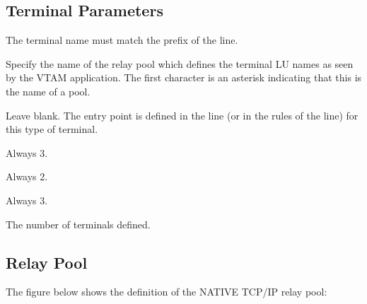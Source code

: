 \documentclass[letterpaper,10pt,english]{sphinxmanual}
\begin{document}
\sphinxAtStartPar
{}

\ignorespaces 

\subsection{Terminal Parameters}
\label{\detokenize{connectivity_guide:index-37}}\label{\detokenize{connectivity_guide:id13}}\begin{description}
\sphinxAtStartPar
The terminal name must match the prefix of the line.

\sphinxAtStartPar
Specify the name of the relay pool which defines the terminal LU
names as seen by the VTAM application. The first character is an
asterisk indicating that this is the name of a pool.

\sphinxAtStartPar
Leave blank. The entry point is defined in the line (or in the rules
of the line) for this type of terminal.

\sphinxAtStartPar
Always 3.

\sphinxAtStartPar
Always 2.

\sphinxAtStartPar
Always 3.

\sphinxAtStartPar
The number of terminals defined.

\end{description}

\ignorespaces 

\subsection{Relay Pool}
\label{\detokenize{connectivity_guide:relay-pool}}\label{\detokenize{connectivity_guide:index-38}}
\sphinxAtStartPar
The figure below shows the definition of the NATIVE TCP/IP relay pool:

\sphinxAtStartPar
{}

\ignorespaces 
\end{document}
